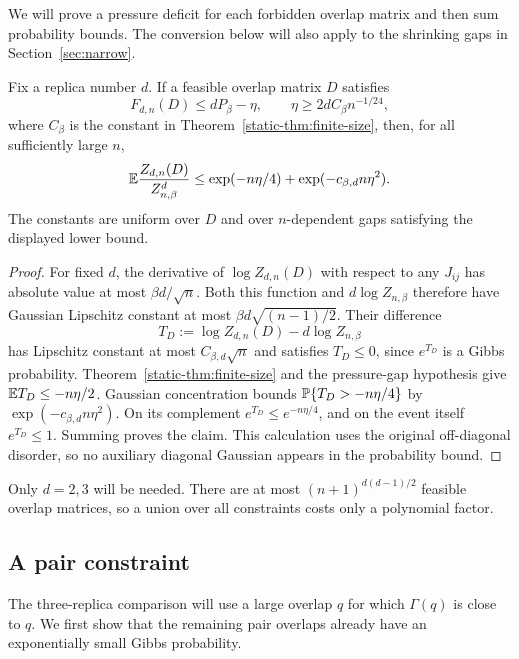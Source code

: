 We will prove a pressure deficit for each forbidden overlap matrix and
then sum probability bounds. The conversion below will also apply to
the shrinking gaps in Section~\ref{sec:narrow}.

\begin{lemma}
\label{lem:pressure-prob}
Fix a replica number $d$. If a feasible overlap matrix $D$ satisfies
\[
 F_{d,n}(D)\le dP_\beta-\eta,
 \qquad \eta\ge2dC_\beta n^{-1/24},
\]
where $C_\beta$ is the constant in
Theorem~\ref{static-thm:finite-size}, then, for all sufficiently large $n$,
\begin{equation}
\label{static-eq:pressure-gap-probability}
 \mathbb E\frac{Z_{d,n}(D)}{Z_{n,\beta}^d}
 \le \exp(-n\eta/4)+\exp(-c_{\beta,d}n\eta^2).
\end{equation}
The constants are uniform over $D$ and over $n$-dependent gaps satisfying
the displayed lower bound.
\end{lemma}
\begin{proof}
For fixed $d$, the derivative of $\log Z_{d,n}(D)$ with respect to any
$J_{ij}$ has absolute value at most $\beta d/\sqrt n$. Both this function
and $d\log Z_{n,\beta}$ therefore have Gaussian Lipschitz constant at most
$\beta d\sqrt{(n-1)/2}$. Their difference
\[
 T_D:=\log Z_{d,n}(D)-d\log Z_{n,\beta}
\]
has Lipschitz constant at most $C_{\beta,d}\sqrt n$ and satisfies
$T_D\le0$, since $e^{T_D}$ is a Gibbs probability.
Theorem~\ref{static-thm:finite-size} and the pressure-gap hypothesis give
$\mathbb E T_D\le-n\eta/2$. Gaussian concentration bounds
$\mathbb P\{T_D>-n\eta/4\}$ by $\exp(-c_{\beta,d}n\eta^2)$.
On its complement $e^{T_D}\le e^{-n\eta/4}$, and on the event itself
$e^{T_D}\le1$. Summing proves the claim. This calculation uses the
original off-diagonal disorder, so no auxiliary diagonal Gaussian
appears in the probability bound.
\end{proof}

Only $d=2,3$ will be needed. There are at most
$(n+1)^{d(d-1)/2}$ feasible overlap matrices, so a union over all
constraints costs only a polynomial factor.

\subsection{A pair constraint}

The three-replica comparison will use a large overlap $q$ for which
$\Gamma(q)$ is close to $q$. We first show that the remaining pair
overlaps already have an exponentially small Gibbs probability.

